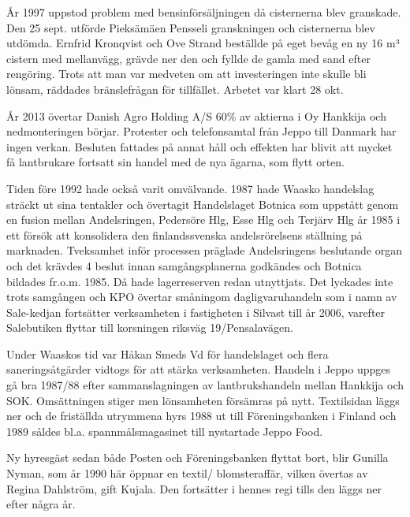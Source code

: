 År 1997 uppstod problem med bensinförsäljningen då cisternerna blev granskade. Den 25 sept. utförde Pieksämäen Pensseli granskningen och cisternerna blev utdömda. Ernfrid Kronqvist och Ove Strand beställde på eget bevåg en ny 16 m³ cistern med mellanvägg, grävde ner den och fyllde de gamla med sand efter rengöring. Trots att man var medveten om att investeringen inte skulle bli lönsam, räddades bränslefrågan för tillfället. Arbetet var klart 28 okt.

År 2013 övertar Danish Agro Holding A/S 60\% av aktierna i Oy Hankkija  och nedmonteringen börjar. Protester och telefonsamtal från Jeppo till Danmark har ingen verkan. Besluten fattades på annat håll och effekten har blivit att mycket få lantbrukare fortsatt sin handel med de nya ägarna, som flytt orten.


%
Tiden före 1992 hade också varit omvälvande. 1987 hade Waasko handelslag sträckt ut sina tentakler och övertagit Handelslaget Botnica som uppstått genom en fusion mellan Andelsringen, Pedersöre Hlg, Esse Hlg och Terjärv Hlg år 1985 i ett försök att konsolidera den finlandssvenska andelsrörelsens ställning på marknaden. Tveksamhet inför processen präglade Andelsringens beslutande organ och det krävdes 4 beslut innan samgångsplanerna godkändes och Botnica bildades fr.o.m. 1985. Då hade lagerreserven redan utnyttjats. Det lyckades inte trots samgången och KPO övertar småningom dagligvaruhandeln som i namn av Sale-kedjan fortsätter verksamheten i fastigheten i Silvast till år 2006, varefter Salebutiken flyttar till korsningen riksväg 19/Pensalavägen.


Under Waaskos tid var Håkan Smeds Vd för handelslaget och flera saneringsåtgärder vidtogs för att stärka verksamheten. Handeln i Jeppo uppges gå bra 1987/88 efter sammanslagningen av lantbrukshandeln mellan Hankkija och SOK. Omsättningen stiger men lönsamheten försämras på nytt. Textilsidan läggs ner och de friställda utrymmena hyrs 1988 ut till Föreningsbanken i Finland och 1989 såldes bl.a. spannmålsmagasinet till nystartade Jeppo Food.

Ny hyresgäst sedan både Posten och Föreningsbanken flyttat bort, blir Gunilla Nyman, som år 1990 här öppnar en textil/ blomsteraffär, vilken övertas av Regina Dahlström, gift Kujala. Den fortsätter i hennes regi tills den läggs ner efter några år.


